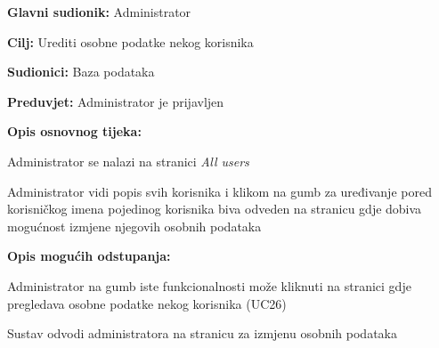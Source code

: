 					\noindent {}
					\begin{packed_item}
	
						\item \textbf{Glavni sudionik: }Administrator
						\item  \textbf{Cilj:} Urediti osobne podatke nekog korisnika
						\item  \textbf{Sudionici:} Baza podataka
						\item  \textbf{Preduvjet:} Administrator je prijavljen
						\item  \textbf{Opis osnovnog tijeka:}
						
						\item[] \begin{packed_enum}
	
							\item Administrator se nalazi na stranici \textit{All users}
							\item Administrator vidi popis svih korisnika i klikom na gumb za uređivanje pored korisničkog imena pojedinog korisnika biva odveden na stranicu gdje dobiva mogućnost izmjene njegovih osobnih podataka
							
						\end{packed_enum}
						
						\pagebreak
						\item  \textbf{Opis mogućih odstupanja:}
						\item[] \begin{packed_item}
	
							\item[2.a] Administrator na gumb iste funkcionalnosti može kliknuti na stranici gdje pregledava osobne podatke nekog korisnika (UC26)
							\item[] \begin{packed_enum}
								
								\item Sustav odvodi administratora na stranicu za izmjenu osobnih podataka
								
							\end{packed_enum}
						\end{packed_item}
					\end{packed_item}
					
